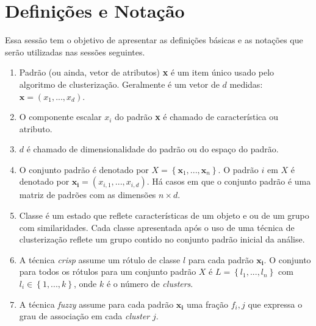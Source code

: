 \newpage

\section{Definições e Notação}
Essa sessão tem o objetivo de apresentar as definições básicas e as notações que serão utilizadas nas sessões seguintes.

\begin{enumerate}
\item Padrão (ou ainda, vetor de atributos) \textbf{x} é um item único usado pelo algoritmo de clusterização. Geralmente é um vetor de $\mathit{d}$ medidas: $\mathbf{x}= (x_{1}, ..., x_{d})$.

\item O componente escalar $x_{i}$ do padrão \textbf{x} é chamado de característica ou atributo.

\item $\mathit{d}$ é chamado de dimensionalidade do padrão ou do espaço do padrão.

\item O conjunto padrão é denotado por $X= \left\{ \mathbf{x}_{1}, ...,\mathbf{x}_{n}\right\}$. O padrão $i$ em $X$ é denotado por $\mathbf{x_i}= (x_{i,1}, ..., x_{i,d})$. Há casos em que o conjunto padrão é uma matriz de padrões com as dimensões $n\times d$.

\item Classe é um estado que reflete características de um objeto e ou de um grupo com similaridades. Cada classe apresentada após o uso de uma técnica de clusterização reflete um grupo contido no conjunto padrão inicial da análise.

\item A técnica \textit{crisp} assume um rótulo de classe $l$ para cada padrão $\mathbf{x_i}$. O conjunto para todos os rótulos para um conjunto padrão $X$ é $L=\left\{l_1, ..., l_n\right\}$ com $l_i \in \left\{1, ..., k\right\}$, onde $k$ é o número de \textit{clusters}.

\item A técnica \textit{fuzzy} assume para cada padrão $\mathbf{x_i}$ uma fração $f_i,j$ que expressa o grau de associação em cada \textit{cluster} $j$.  
\end{enumerate}
